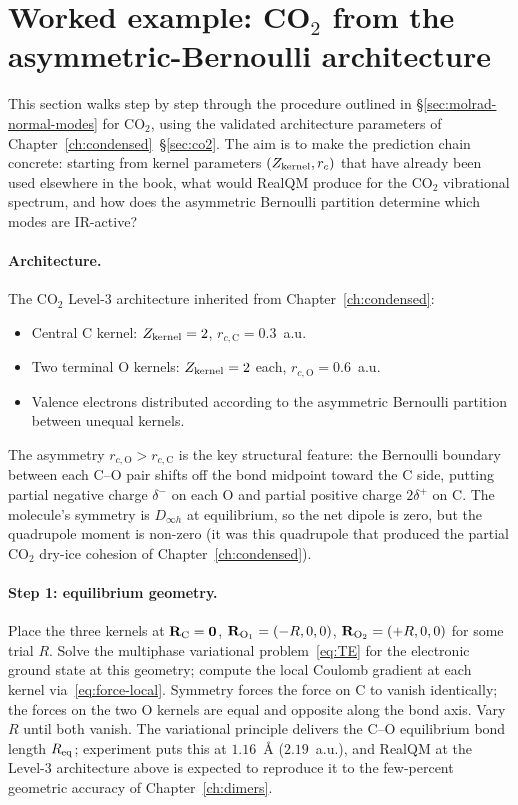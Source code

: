 \section{Worked example: CO$_2$ from the asymmetric-Bernoulli architecture}\label{sec:molrad-co2-worked}

This section walks step by step through the procedure outlined in \S\ref{sec:molrad-normal-modes} for CO$_2$, using the validated architecture parameters of Chapter~\ref{ch:condensed}~\S\ref{sec:co2}. The aim is to make the prediction chain concrete: starting from kernel parameters $(Z_{\rm kernel}, r_c)$ that have already been used elsewhere in the book, what would RealQM produce for the CO$_2$ vibrational spectrum, and how does the asymmetric Bernoulli partition determine which modes are IR-active?

\paragraph{Architecture.}
The CO$_2$ Level-3 architecture inherited from Chapter~\ref{ch:condensed}:
\begin{itemize}
\item Central C kernel: $Z_{\rm kernel} = 2$, $r_{c,\mathrm{C}} = 0.3$~a.u.
\item Two terminal O kernels: $Z_{\rm kernel} = 2$ each, $r_{c,\mathrm{O}} = 0.6$~a.u.
\item Valence electrons distributed according to the asymmetric Bernoulli partition between unequal kernels.
\end{itemize}
The asymmetry $r_{c,\mathrm{O}} > r_{c,\mathrm{C}}$ is the key structural feature: the Bernoulli boundary between each C--O pair shifts off the bond midpoint toward the C side, putting partial negative charge $\delta^-$ on each O and partial positive charge $2\delta^+$ on C. The molecule's symmetry is $D_{\infty h}$ at equilibrium, so the net dipole is zero, but the quadrupole moment is non-zero (it was this quadrupole that produced the partial CO$_2$ dry-ice cohesion of Chapter~\ref{ch:condensed}).

\paragraph{Step 1: equilibrium geometry.}
Place the three kernels at $\mathbf{R}_{\rm C} = \mathbf{0}$, $\mathbf{R}_{\rm O_1} = (-R, 0, 0)$, $\mathbf{R}_{\rm O_2} = (+R, 0, 0)$ for some trial $R$. Solve the multiphase variational problem~\eqref{eq:TE} for the electronic ground state at this geometry; compute the local Coulomb gradient at each kernel via~\eqref{eq:force-local}. Symmetry forces the force on C to vanish identically; the forces on the two O kernels are equal and opposite along the bond axis. Vary $R$ until both vanish. The variational principle delivers the C--O equilibrium bond length $R_{\rm eq}$; experiment puts this at $1.16$~\AA{} ($2.19$~a.u.), and RealQM at the Level-3 architecture above is expected to reproduce it to the few-percent geometric accuracy of Chapter~\ref{ch:dimers}.

